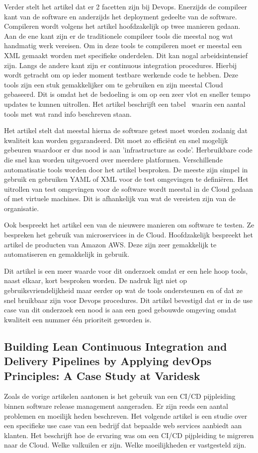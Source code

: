 Verder stelt het artikel \autocite{Ebert2016} dat er 2 facetten zijn bij Devops. Enerzijds de compileer kant van de software en anderzijds het deployment gedeelte van de software. Compileren wordt volgens het artikel hoofdzakelijk op twee manieren gedaan. Aan de ene kant zijn er de traditionele compileer tools die meestal nog wat handmatig werk vereisen. Om in deze tools te compileren moet er meestal een XML gemaakt worden met specifieke onderdelen. Dit kan nogal arbeidsintensief zijn. Langs de andere kant zijn er continuous integration procedures. Hierbij wordt getracht om op ieder moment testbare werkende code te hebben. Deze tools zijn een stuk gemakkelijker om te gebruiken en zijn meestal Cloud gebaseerd. Dit is omdat het de bedoeling is om op een zeer vlot en sneller tempo updates te kunnen uitrollen. Het artikel beschrijft een tabel~\textcite{Ebert2016} waarin een aantal tools met wat rand info beschreven staan.

Het artikel \autocite{Ebert2016} stelt dat meestal hierna de software getest moet worden zodanig dat kwaliteit kan worden gegarandeerd. Dit moet zo efficiënt en snel mogelijk gebeuren waardoor er dus nood is aan 'infrastructure as code'. Herbruikbare code die snel kan worden uitgevoerd over meerdere platformen. Verschillende automatisatie tools worden door het artikel besproken. De meeste zijn simpel in gebruik en gebruiken YAML of XML voor de test omgevingen te definiëren. Het uitrollen van test omgevingen voor de software wordt meestal in de Cloud gedaan of met virtuele machines. Dit is afhankelijk van wat de vereisten zijn van de organisatie. 

Ook bespreekt het artikel \autocite{Ebert2016} een van de nieuwere manieren om software te testen. Ze bespreken het gebruik van microservices in de Cloud. Hoofdzakelijk bespreekt het artikel de producten van Amazon AWS. Deze zijn zeer gemakkelijk te automatiseren en gemakkelijk in gebruik.

Dit artikel \autocite{Ebert2016} is een meer waarde voor dit onderzoek omdat er een hele hoop tools, naast elkaar, kort besproken worden. De nadruk ligt niet op gebruiksvriendelijkheid maar eerder op wat de tools ondersteunen en of dat ze snel bruikbaar zijn voor Devops procedures. Dit artikel bevestigd dat er in de use case van dit onderzoek een nood is aan een goed gebouwde omgeving omdat kwaliteit een nummer één prioriteit geworden is.

\subsection{Building Lean Continuous Integration and Delivery Pipelines by Applying devOps Principles: A Case Study at Varidesk}
Zoals de vorige artikelen aantonen is het gebruik van een CI/CD pijpleiding binnen software release management aangeraden. Er zijn reeds een aantal problemen en moeilijk heden beschreven. Het volgende artikel \autocite{Debroy2018} is een studie over een specifieke use case van een bedrijf dat bepaalde web services aanbiedt aan klanten. Het beschrijft hoe de ervaring was om een CI/CD pijpleiding te migreren naar de Cloud. Welke valkuilen er zijn. Welke moeilijkheden er vastgesteld zijn.

